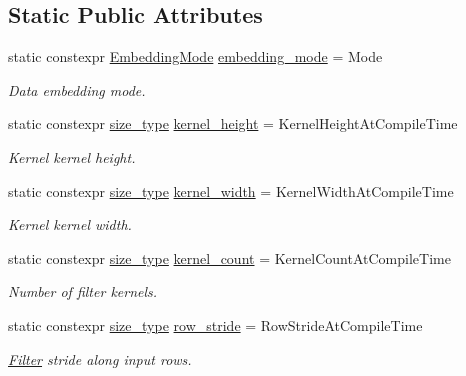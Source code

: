 \subsection*{Static Public Attributes}
\begin{DoxyCompactItemize}
\item 
static constexpr \hyperlink{namespaceffnn_1_1layer_1_1convolution_ad420d4eb8edd7c254d1f0aaaad81017f}{Embedding\-Mode} \hyperlink{structffnn_1_1layer_1_1convolution_1_1options_a7befeba5b65e0442750d11713cedc816}{embedding\-\_\-mode} = Mode
\begin{DoxyCompactList}\small\item\em Data embedding mode. \end{DoxyCompactList}\item 
static constexpr \hyperlink{namespaceffnn_a63b90a2fd70eb76684eac482a51633e5}{size\-\_\-type} \hyperlink{structffnn_1_1layer_1_1convolution_1_1options_a36fbdfa26d8032268955f68e66f09662}{kernel\-\_\-height} = Kernel\-Height\-At\-Compile\-Time
\begin{DoxyCompactList}\small\item\em Kernel kernel height. \end{DoxyCompactList}\item 
static constexpr \hyperlink{namespaceffnn_a63b90a2fd70eb76684eac482a51633e5}{size\-\_\-type} \hyperlink{structffnn_1_1layer_1_1convolution_1_1options_a10296c3b7e5994a25b8c22f11b4252ca}{kernel\-\_\-width} = Kernel\-Width\-At\-Compile\-Time
\begin{DoxyCompactList}\small\item\em Kernel kernel width. \end{DoxyCompactList}\item 
static constexpr \hyperlink{namespaceffnn_a63b90a2fd70eb76684eac482a51633e5}{size\-\_\-type} \hyperlink{structffnn_1_1layer_1_1convolution_1_1options_a171b201743a4d63fac53b414980b24ea}{kernel\-\_\-count} = Kernel\-Count\-At\-Compile\-Time
\begin{DoxyCompactList}\small\item\em Number of filter kernels. \end{DoxyCompactList}\item 
static constexpr \hyperlink{namespaceffnn_a63b90a2fd70eb76684eac482a51633e5}{size\-\_\-type} \hyperlink{structffnn_1_1layer_1_1convolution_1_1options_af557eea786920cd6341ca8a0498d3791}{row\-\_\-stride} = Row\-Stride\-At\-Compile\-Time
\begin{DoxyCompactList}\small\item\em \hyperlink{classffnn_1_1layer_1_1convolution_1_1_filter}{Filter} stride along input rows. \end{DoxyCompactList}\item 

\end{DoxyCompactItemize}
